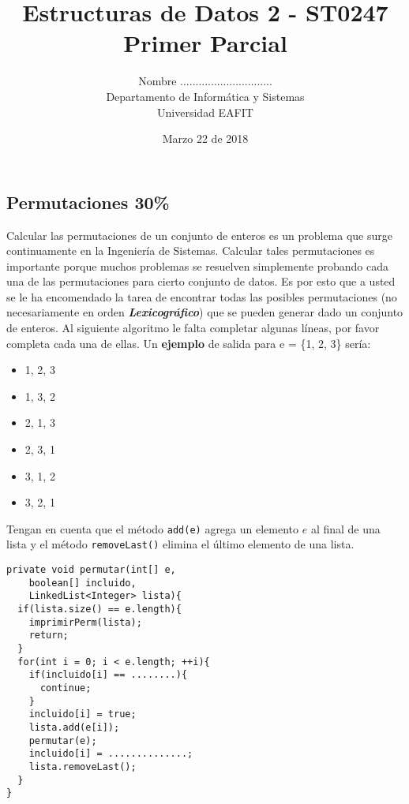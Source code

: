 \documentclass[10 pt]{article}
\title{\textbf {Estructuras de Datos 2 - ST0247\\Primer Parcial}}
\author{Nombre ..............................\\
		Departamento de Informática y Sistemas\\
		Universidad EAFIT\\}
\date{Marzo 22 de 2018}
\begin{document}

\lstset{escapechar=@,style=customc, numbers=left, stepnumber = 1} 
\maketitle
\begin{multicols}{2}
\section{Permutaciones 30\%}
Calcular las permutaciones de un conjunto de enteros es un problema que surge continuamente en la Ingeniería de Sistemas. Calcular tales permutaciones es importante porque muchos problemas se resuelven simplemente probando cada una de las permutaciones para cierto conjunto de datos. Es por esto que a usted se le ha encomendado la tarea de encontrar todas las posibles permutaciones (no necesariamente en orden \textbf{\textit{Lexicográfico}}) que se pueden generar dado un conjunto de enteros. Al siguiente algoritmo le falta completar algunas líneas, por favor completa cada una de ellas. Un \textbf{ejemplo} de salida para e = \{1, 2, 3\} sería:
\begin{itemize}
\item 1, 2, 3
\item 1, 3, 2
\item 2, 1, 3
\item 2, 3, 1
\item 3, 1, 2
\item 3, 2, 1
\end{itemize}

Tengan en cuenta que el método \texttt{add(e)} agrega un elemento $e$ al final de una lista y el método \texttt{removeLast()}
elimina el último elemento de una lista.

\begin{lstlisting}
private void permutar(int[] e, 
    boolean[] incluido, 
    LinkedList<Integer> lista){  
  if(lista.size() == e.length){
    imprimirPerm(lista);
    return;
  }
  for(int i = 0; i < e.length; ++i){
    if(incluido[i] == ........){
      continue;    
    }  
    incluido[i] = true;
    lista.add(e[i]);
    permutar(e);
    incluido[i] = ..............;
    lista.removeLast();
  }
}


\end{lstlisting}
\end{multicols}
\end{document}
